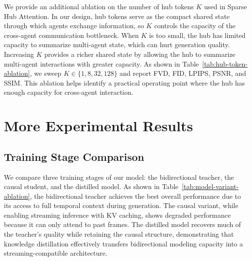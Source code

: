 We provide an additional ablation on the number of hub tokens $K$ used in Sparse Hub Attention.
In our design, hub tokens serve as the compact shared state through which agents exchange information, so $K$ controls the capacity of the cross-agent communication bottleneck.
When $K$ is too small, the hub has limited capacity to summarize multi-agent state, which can hurt generation quality.
Increasing $K$ provides a richer shared state by allowing the hub to summarize multi-agent interactions with greater capacity.
As shown in Table~\ref{tab:hub-token-ablation}, we sweep $K\in\{1,8,32,128\}$ and report FVD, FID, LPIPS, PSNR, and SSIM.
This ablation helps identify a practical operating point where the hub has enough capacity for cross-agent interaction.



\section{More Experimental Results}
\label{app:more-experimental-results}

\subsection{Training Stage Comparison}
\label{app:training-stage-comparison}

We compare three training stages of our model: the bidirectional teacher, the causal student, and the distilled model.
As shown in Table~\ref{tab:model-variant-ablation}, the bidirectional teacher achieves the best overall performance due to its access to full temporal context during generation.
The causal variant, while enabling streaming inference with KV caching, shows degraded performance because it can only attend to past frames.
The distilled model recovers much of the teacher's quality while retaining the causal structure, demonstrating that knowledge distillation effectively transfers bidirectional modeling capacity into a streaming-compatible architecture.
